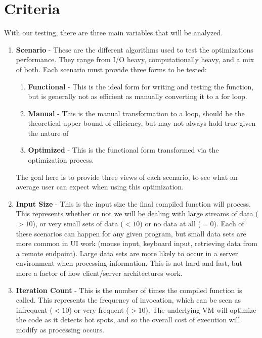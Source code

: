\section{Criteria}

With our testing, there are three main variables that will be analyzed.

\begin{enumerate}
  \item \textbf{Scenario} - These are the different algorithms used to test the optimizations performance. They range from I/O heavy, computationally heavy, and a mix of both.  Each scenario must provide three forms to be tested:
    \begin{enumerate}
      \item \textbf{Functional} - This is the ideal form for writing and testing the function, but is generally not as efficient as manually converting it to a for loop.
      \item \textbf{Manual} - This is the manual transformation to a  loop, should be the theoretical upper bound of efficiency, but may not always hold true given the nature of \javascript
      \item \textbf{Optimized} - This is the functional form transformed via the optimization process.  
    \end{enumerate}
  The goal here is to provide three views of each scenario, to see what an average user can expect when using this optimization.
  \item \textbf{Input Size} - This is the input size the final compiled function will process.  This represents whether or not we will be dealing with large streams of data ($> 10$), or very small sets of data ($< 10$) or no data at all ($=0$).  Each of these scenarios can happen for any given program, but small data sets are more common in UI work (mouse input, keyboard input, retrieving data from a remote endpoint).  Large data sets are more likely to occur in a server environment when processing information. This is not hard and fast, but more a factor of how client/server architectures work. 
  \item \textbf{Iteration Count} - This is the number of times the compiled function is called.  This represents the frequency of invocation, which can be seen as infrequent ($< 10$) or very frequent ($> 10$).  The underlying VM will optimize the code as it detects hot spots, and so the overall cost of execution will modify as processing occurs.  
\end{enumerate}

